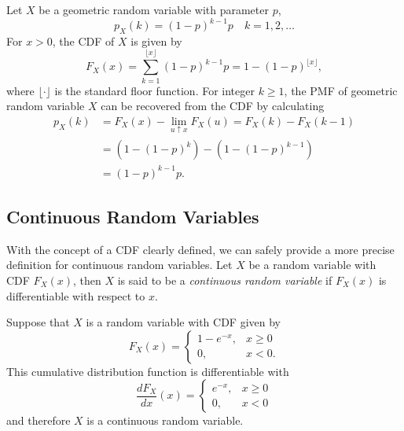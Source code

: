 \begin{example}
Let $X$ be a geometric random variable with parameter $p$,
\begin{equation*}
p_X (k) = (1 - p)^{k-1} p \quad k = 1, 2, \ldots 
\end{equation*}
For $x > 0$, the CDF of $X$ is given by
\begin{equation*}
F_X (x) = \sum_{k = 1}^{\lfloor x \rfloor} (1 - p)^{k-1} p
= 1 - (1 - p)^{\lfloor x \rfloor} ,
\end{equation*}
where $\lfloor \cdot \rfloor$ is the standard floor function.
For integer $k \geq 1$, the PMF of geometric random variable $X$ can be recovered from the CDF by calculating
\begin{equation*}
\begin{split}
p_X (k) &= F_X (x) - \lim_{u \uparrow x} F_X (u) = F_X (k) - F_X (k-1) \\
&= \left( 1 - (1-p)^k \right) - \left( 1 - (1-p)^{k-1} \right) \\
&= (1 - p)^{k-1} p .
\end{split}
\end{equation*}
\end{example}


\subsection{Continuous Random Variables}

With the concept of a CDF clearly defined, we can safely provide a more precise definition for continuous random variables.
Let $X$ be a random variable with CDF $F_X (x)$, then $X$ is said to be a \emph{continuous random variable} if $F_X (x)$ is differentiable with respect to $x$. 

\begin{example}
Suppose that $X$ is a random variable with CDF given by
\begin{equation*}
F_X(x) = \begin{cases} 1 - e^{-x}, & x \geq 0 \\
0, & x < 0 . \end{cases}
\end{equation*}
This cumulative distribution function is differentiable with
\begin{equation*}
\frac{dF_X}{dx}(x)
= \begin{cases} e^{-x}, & x \geq 0 \\
0, & x < 0 \end{cases}
\end{equation*}
and therefore $X$ is a continuous random variable.
\end{example}


